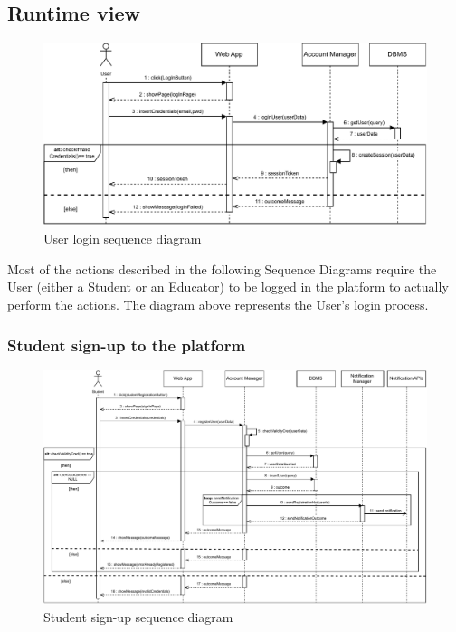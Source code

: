 \documentclass{article}
\begin{document}
{\subsection{Runtime view}
    \begin{figure}[H]
        \centering
        \hspace*{-1cm}\includegraphics[scale=0.8]{Sequence/SequenceLogin.pdf}
        \caption{User login sequence diagram}
        \label{fig:userLogin}
    \end{figure}

    Most of the actions described in the following Sequence Diagrams require the User
    (either a Student or an Educator) to be logged in the platform to actually perform the actions.
    The diagram above represents the User's login process.

    \subsubsection{Student sign-up to the platform}
        \begin{figure}[H]
            \centering
            \hspace*{-2cm}\includegraphics[scale=0.65]{Sequence/Sequence1DD.pdf}
            \caption{Student sign-up sequence diagram}
            \label{fig:Sequence1DD}
        \end{figure}

}
\end{document}
